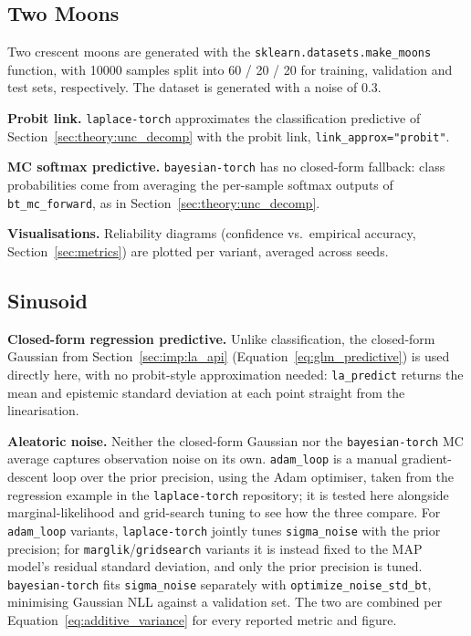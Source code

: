 \documentclass[conference]{IEEEtran}
\begin{document}
\subsection{Two Moons}

Two crescent moons are generated with the \texttt{sklearn.datasets.make\_moons} function,
with 10000 samples split into 60 / 20 / 20 for training, validation and test sets,
respectively. The dataset is generated with a noise of 0.3.

\textbf{Probit link.}
\label{sec:imp:probit}
\texttt{laplace-torch} approximates the classification predictive
of Section~\ref{sec:theory:unc_decomp} with the probit link, \texttt{link\_approx="probit"}.

\textbf{MC softmax predictive.} \texttt{bayesian-torch} has no closed-form fallback: class
probabilities come from averaging the per-sample softmax outputs of
\texttt{bt\_mc\_forward}, as in Section~\ref{sec:theory:unc_decomp}.

\textbf{Visualisations.} Reliability diagrams (confidence vs.\ empirical accuracy,
Section~\ref{sec:metrics}) are plotted per variant, averaged across seeds.

\subsection{Sinusoid}
\label{sec:imp:sinusoid}

\textbf{Closed-form regression predictive.} Unlike classification, the closed-form
Gaussian from Section~\ref{sec:imp:la_api} (Equation~\eqref{eq:glm_predictive}) is used directly here, with no probit-style
approximation needed: \texttt{la\_predict} returns the mean and epistemic standard deviation
at each point straight from the linearisation.

\textbf{Aleatoric noise.} Neither the closed-form Gaussian nor the
\texttt{bayesian-torch} MC average captures observation noise on its own.
\texttt{adam\_loop} is a manual gradient-descent loop over the prior precision, using the
Adam optimiser, taken from the regression example in the \texttt{laplace-torch} repository;
it is tested here alongside marginal-likelihood and grid-search tuning to see how the three
compare. For \texttt{adam\_loop} variants, \texttt{laplace-torch} jointly tunes
\texttt{sigma\_noise} with the prior precision; for \texttt{marglik}/\texttt{gridsearch}
variants it is instead fixed to the MAP model's residual standard deviation, and only the
prior precision is tuned. \texttt{bayesian-torch} fits \texttt{sigma\_noise} separately with
\texttt{optimize\_noise\_std\_bt}, minimising Gaussian NLL against a validation set. The two
are combined per Equation~\eqref{eq:additive_variance} for every reported metric and
figure.
\end{document}
